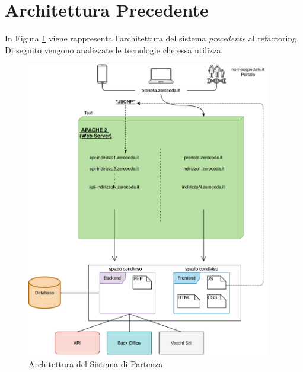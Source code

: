 \section{Architettura Precedente}
In Figura \ref{fig:oldarchitecture} viene rappresenta l'architettura del sistema \emph{precedente} al refactoring. Di seguito vengono analizzate le tecnologie che essa utilizza.
\begin{figure}[H]
    \centering
    \includegraphics[width=0.95\textwidth]{images/02_3_old_architecture.pdf}
    \caption{Architettura del Sistema di Partenza}
    \label{fig:oldarchitecture}
\end{figure}

